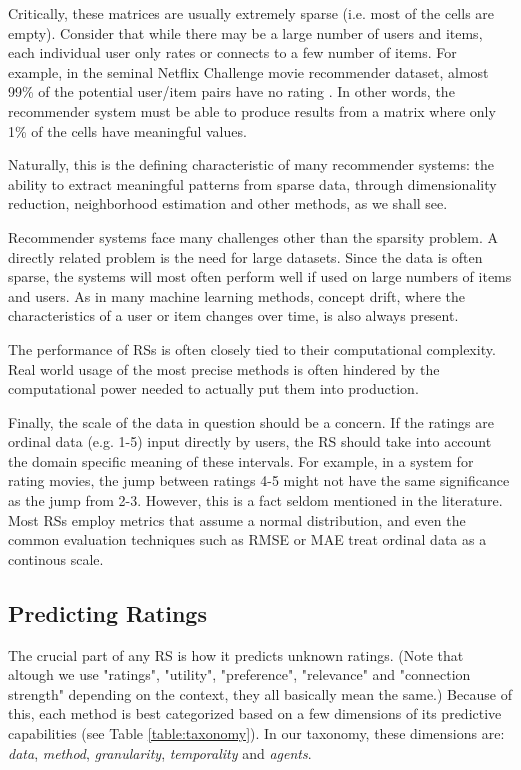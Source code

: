 Critically, these matrices are usually extremely sparse (i.e. most of the cells are empty). 
Consider that while there may be a large number of users and items, each individual user
only rates or connects to a few number of items. 
For example, in the seminal Netflix Challenge movie recommender dataset, almost 99\% of the potential
user/item pairs have no rating \citep[p1]{Bell2007d}. In other words, the recommender system must be able
to produce results from a matrix where only 1\% of the cells have meaningful values.

Naturally, this is the defining characteristic of 
many recommender systems: the ability to extract meaningful patterns from sparse data, 
through dimensionality reduction, neighborhood estimation and other methods, as we shall see.

Recommender systems face many challenges other than the sparsity problem.
A directly related problem is the need for large datasets. Since the data is often sparse,
the systems will most often perform well if used on large numbers of items and users.
As in many machine learning methods, concept drift, where the characteristics of a user or item
changes over time, is also always present.

The performance of RSs is often closely tied to their computational complexity. 
Real world usage of the most precise methods is often hindered by the computational power
needed to actually put them into production.

Finally, the scale of the data in question should be a concern. If the ratings are ordinal data (e.g. 1-5)
input directly by users, the RS should take into account the domain specific meaning of these intervals.
For example, in a system for rating movies, the jump between ratings 4-5 might not have the same significance as
the jump from 2-3. However, this is a fact seldom mentioned in the literature. Most RSs 
employ metrics that assume a normal distribution, and even the common
evaluation techniques such as RMSE or MAE treat ordinal data as a continous scale. 


\subsection{Predicting Ratings}

The crucial part of any RS is how it predicts unknown ratings.
(Note that altough we use "ratings", "utility", "preference", "relevance" and "connection strength" depending on the context, they all basically mean the same.)
Because of this, each method is best categorized based on a few dimensions of its predictive capabilities (see Table \ref{table:taxonomy}).
In our taxonomy, these dimensions are: \emph{data}, \emph{method}, \emph{granularity}, \emph{temporality} and \emph{agents}.

